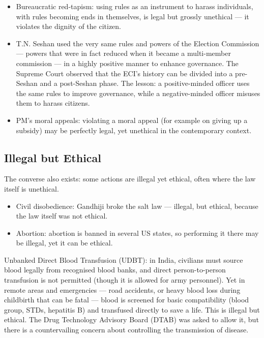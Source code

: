 \begin{itemize}
\item Bureaucratic red-tapism: using rules as an instrument to harass individuals, with rules becoming ends in themselves, is legal but grossly unethical --- it violates the dignity of the citizen.
\end{itemize}

\begin{ExampleBox}
\begin{itemize}
\item T.N. Seshan used the very same rules and powers of the Election Commission --- powers that were in fact reduced when it became a multi-member commission --- in a highly positive manner to enhance governance. The Supreme Court observed that the ECI's history can be divided into a pre-Seshan and a post-Seshan phase. The lesson: a positive-minded officer uses the same rules to improve governance, while a negative-minded officer misuses them to harass citizens.
\item PM's moral appeals: violating a moral appeal (for example on giving up a subsidy) may be perfectly legal, yet unethical in the contemporary context.
\end{itemize}
\end{ExampleBox}

\subsection{Illegal but Ethical}

The converse also exists: some actions are illegal yet ethical, often where the law itself is unethical.

\begin{itemize}
\item Civil disobedience: Gandhiji broke the salt law --- illegal, but ethical, because the law itself was not ethical.
\item Abortion: abortion is banned in several US states, so performing it there may be illegal, yet it can be ethical.
\end{itemize}

\begin{GovtPolicy}
Unbanked Direct Blood Transfusion (UDBT): in India, civilians must source blood legally from recognised blood banks, and direct person-to-person transfusion is not permitted (though it is allowed for army personnel). Yet in remote areas and emergencies --- road accidents, or heavy blood loss during childbirth that can be fatal --- blood is screened for basic compatibility (blood group, STDs, hepatitis B) and transfused directly to save a life. This is illegal but ethical. The Drug Technology Advisory Board (DTAB) was asked to allow it, but there is a countervailing concern about controlling the transmission of disease.
\end{GovtPolicy}

